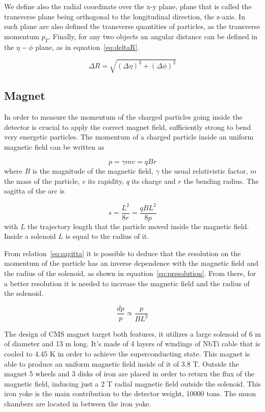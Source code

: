 We define also the radial coordinate over the x-y plane, plane that is called the transverse plane being orthogonal to the longitudinal direction, the z-axis. In such plane are also defined the transverse quantities of particles, as the transverse momentum $p_{T}$. Finally, for any two objects an angular distance can be defined in the $\eta-\phi$ plane, as in equation~\ref{eq:deltaR}.

\begin{equation}
  \label{eq:deltaR}
  \Delta R=\sqrt{(\Delta\eta)^{2}+(\Delta\phi)^{2}}
\end{equation}

\subsection{Magnet}
\label{sec:magnet}

In order to measure the momentum of the charged particles going inside the detector is crucial to apply the correct magnet field, sufficiently strong to bend very energetic particles. The momentum of a charged particle inside an uniform magnetic field can be written as

\begin{equation}
  \label{eq:momB}
  p=\gamma m v=qBr
\end{equation} where $B$ is the magnitude of the magnetic field, $\gamma$ the usual relativistic factor, $m$ the mass of the particle, $v$ its rapidity, $q$ its charge and $r$ the bending radius. The sagitta of the arc is

\begin{equation}
  \label{eq:sagitta}
  s=\frac{L^{2}}{8r}=\frac{qBL^{2}}{8p}
\end{equation} with $L$ the trajectory length that the particle moved inside the magnetic field. Inside a solenoid $L$ is equal to the radius of it. 

From relation~\ref{eq:sagitta} it is possible to deduce that the resolution on the momentum of the particle has an inverse dependence with the magnetic field and the radius of the solenoid, as shown in equation~\ref{eq:presolution}. From there, for a better resolution it is needed to increase the magnetic field and the radius of the solenoid. 

\begin{equation}
  \label{eq:presolution}
  \frac{dp}{p}\propto \frac{p}{BL^{2}}
\end{equation}

The design of CMS magnet target both features, it utilizes a large solenoid of 6 m of diameter and 13 m long. It's made of 4 layers of windings of NbTi cable that is cooled to 4.45 K in order to achieve the superconducting state. This magnet is able to produce an uniform magnetic field inside of it of 3.8 T. Outside the magnet 5 wheels and 3 disks of iron are placed in order to return the flux of the magnetic field, inducing just a 2 T radial magnetic field outside the solenoid. This iron yoke is the main contribution to the detector weight, 10000 tons. The muon chambers are located in between the iron yoke.

